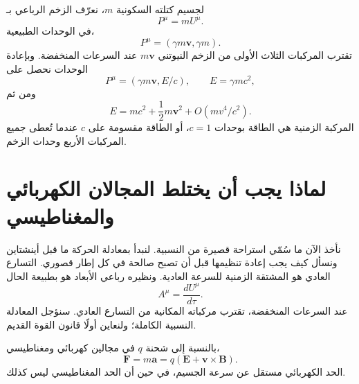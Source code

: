 لجسيم كتلته السكونية \(m\)، نعرّف الزخم الرباعي بـ
\begin{equation}
  P^\mu=mU^\mu.
\end{equation}
في الوحدات الطبيعية،
\begin{equation}
  P^\mu=(\gamma m\boldsymbol v,\gamma m).
\end{equation}
تقترب المركبات الثلاث الأولى من الزخم النيوتني \(m\boldsymbol v\) عند السرعات المنخفضة. وبإعادة الوحدات نحصل على
\begin{equation}
  P^\mu=(\gamma m\boldsymbol v,E/c),
  \qquad E=\gamma mc^2,
\end{equation}
ومن ثم
\begin{equation}
  E=mc^2+\frac{1}{2}m\boldsymbol v^2+O(mv^4/c^2).
\end{equation}
المركبة الزمنية هي الطاقة بوحدات \(c=1\)، أو الطاقة مقسومة على \(c\) عندما تُعطى جميع المركبات الأربع وحدات الزخم.

\begin{classroomqa}
\end{classroomqa}

\section{لماذا يجب أن يختلط المجالان الكهربائي والمغناطيسي}

نأخذ الآن ما سُمّي استراحة قصيرة من النسبية. لنبدأ بمعادلة الحركة ما قبل أينشتاين ونسأل كيف يجب إعادة تنظيمها قبل أن تصبح صالحة في كل إطار قصوري. التسارع العادي هو المشتقة الزمنية للسرعة العادية. ونظيره رباعي الأبعاد هو بطبيعة الحال
\begin{equation}
  A^\mu=\frac{dU^\mu}{d\tau}.
\end{equation}
عند السرعات المنخفضة، تقترب مركباته المكانية من التسارع العادي. سنؤجل المعادلة النسبية الكاملة؛ ولنعاين أولًا قانون القوة القديم.

بالنسبة إلى شحنة \(q\) في مجالين كهربائي ومغناطيسي،
\begin{equation}
  \boldsymbol F=m\boldsymbol a
  =q\left(\boldsymbol E+\boldsymbol v\times\boldsymbol B\right).
                                                                  \label{eq:l6-lorentz-force}
\end{equation}
الحد الكهربائي مستقل عن سرعة الجسيم، في حين أن الحد المغناطيسي ليس كذلك.

